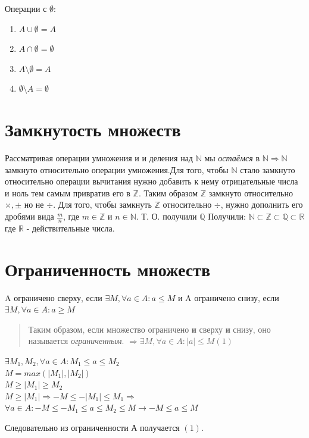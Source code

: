 \documentclass[oneside]{book}
\begin{document}
\begin{enumerate}
Операции с $\emptyset$:

\begin{enumerate}
    \item $A \cup \emptyset = A$
    \item $A \cap \emptyset = \emptyset$
    \item $A \setminus \emptyset = A$
    \item $\emptyset \setminus A = \emptyset$
\end{enumerate}


\section{Замкнутость множеств}

Рассматривая операции умножения и и деления над $\mathbb{N}$ мы \textit{остаёмся} в $\mathbb{N} \Rightarrow
\mathbb{N}$ замкнуто относительно операции умножения.Для того, чтобы $\mathbb{N}$ стало замкнуто относительно
операции вычитания нужно добавить к нему отрицательные числа и ноль тем самым привратив его в $\mathbb{Z}$.
Таким образом $\mathbb{Z}$ замкнуто относительно $\times, \pm$ но не $\div$. Для того, чтобы замкнуть
$\mathbb{Z}$ относительно $\div$, нужно дополнить его дробями вида $\frac{m}{n}$, где $m \in \mathbb{Z}$
и $n \in \mathbb{N}$. Т. О. получили $\mathbb{Q}$ Получили: $\mathbb{N} \subset \mathbb{Z} \subset \mathbb{Q}
\subset \mathbb{R}$ где $\mathbb{R}$ - действительные числа.

\section{Ограниченность множеств}

A ограничено сверху, если $\exists M, \forall a \in A : a \leq M$ и A ограничено снизу, если $\exists M, \forall a \in A : a \geq M$
\begin{quote}
    Таким образом, если множество ограничено \textbf{и} сверху \textbf{и} снизу, оно называется \textit{ограниченным}.
    $\Rightarrow \exists M, \forall a \in A : |a| \leq M (1)$
\end{quote}

\begin{center}
    $\exists M_1, M_2, \forall a \in A : M_1 \leq a \leq M_2$\\
    $M = max(|M_1|, |M_2|)$\\
    $M \geq |M_1| \geq M_2$\\
    $M \geq |M_1| \Rightarrow -M \leq -|M_1| \leq M_1 \Rightarrow$\\
    $\forall a \in A : -M \leq -M_1 \leq a \leq M_2 \leq M \rightarrow -M \leq a \leq M$
\end{center}
Следовательно из ограниченности А получается $(1)$.


\end{enumerate}
\end{document}
